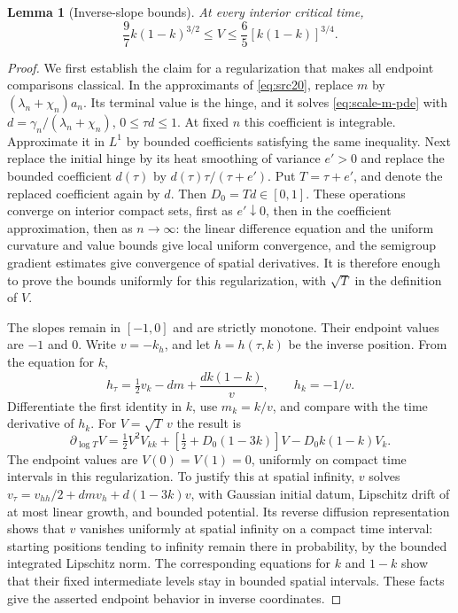 \documentclass[11pt,a4paper]{article}
\numberwithin{equation}{section}
\newtheorem{lemma}[theorem]{Lemma}
\theoremstyle{definition}
\theoremstyle{remark}
\begin{document}
\begin{lemma}[Inverse-slope bounds]\label{lem:scale-inverse-slope}
At every interior critical time,
\begin{equation}\label{eq:src32}
 \frac97 k(1-k)^{3/2}\le V\le\frac65[k(1-k)]^{3/4}.
\end{equation}
\end{lemma}
\begin{proof}
We first establish the claim for a regularization that makes all
endpoint comparisons classical. In the approximants of
\eqref{eq:src20}, replace $m$ by $(\lambda_n+\chi_n)a_n$.
Its terminal value is the hinge, and it solves
\eqref{eq:scale-m-pde} with
$d=\gamma_n/(\lambda_n+\chi_n)$, $0\le\tau d\le1$.
At fixed $n$ this coefficient is integrable. Approximate it in $L^1$
by bounded coefficients satisfying the same inequality. Next replace
the initial hinge by its heat smoothing of variance $e'>0$ and
replace the bounded coefficient $d(\tau)$ by
$d(\tau)\tau/(\tau+e')$. Put $T=\tau+e'$, and denote the replaced
coefficient again by $d$. Then $D_0=Td\in[0,1]$.
These operations converge on interior compact sets, first as
$e'\downarrow0$, then in the coefficient approximation, then as
$n\to\infty$: the linear difference equation and the uniform
curvature and value bounds give local uniform convergence, and the
semigroup gradient estimates give convergence of spatial derivatives.
It is therefore enough to prove the bounds uniformly for this
regularization, with $\sqrt T$ in the definition of $V$.

The slopes remain in $[-1,0]$ and are strictly monotone. Their endpoint
values are $-1$ and $0$. Write $v=-k_h$, and let $h=h(\tau,k)$ be
the inverse position. From the equation for $k$,
\[
 h_\tau=\tfrac12v_k-dm+\frac{d k(1-k)}v,\qquad h_k=-1/v.
\]
Differentiate the first identity in $k$, use $m_k=k/v$, and compare
with the time derivative of $h_k$. For $V=\sqrt T\,v$ the result is
\begin{equation}\label{eq:scale-inverse-pde}
 \partial_{\log T}V=\tfrac12V^2V_{kk}
  +[\tfrac12+D_0(1-3k)]V-D_0k(1-k)V_k.
\end{equation}
The endpoint values are $V(0)=V(1)=0$, uniformly on compact time
intervals in this regularization. To justify this at spatial infinity,
$v$ solves
$v_\tau=v_{hh}/2+d m v_h+d(1-3k)v$, with Gaussian initial datum,
Lipschitz drift of at most linear growth, and bounded potential.
Its reverse diffusion representation shows that $v$ vanishes uniformly
at spatial infinity on a compact time interval: starting positions
tending to infinity remain there in probability, by the bounded
integrated Lipschitz norm. The corresponding equations for $k$ and
$1-k$ show that their fixed intermediate levels stay in bounded
spatial intervals. These facts give the asserted endpoint behavior
in inverse coordinates.


\end{proof}
\end{document}
